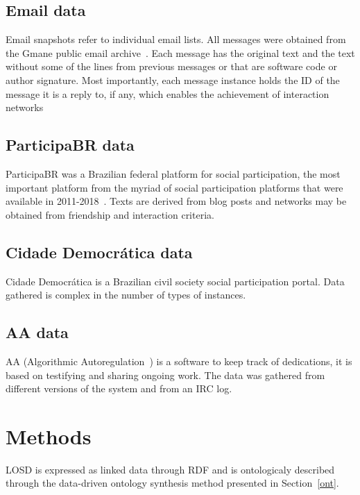 \documentclass[journal,article,submit,moreauthors,pdftex]{Definitions/mdpi}
\begin{document}
\subsection{Email data}
Email snapshots refer to individual email lists.
All messages were obtained from the Gmane public email archive~\cite{gmane}.
Each message has the original text and the text without some of the lines
from previous messages or that are software code or author signature.
Most importantly, each message instance holds the ID of the message it is
a reply to, if any, which enables the achievement of interaction networks~\cite{bird,stab}

\subsection{ParticipaBR data}
ParticipaBR was a Brazilian federal platform for social participation,
the most important platform from the myriad of social participation platforms
that were available in 2011-2018~\cite{spbr}.
Texts are derived from blog posts and networks may be obtained from
friendship and interaction criteria.

\subsection{Cidade Democr\'atica data}
Cidade Democrática is a Brazilian civil society social participation portal.
Data gathered is complex in the number of types of instances.

\subsection{AA data}
AA (Algorithmic Autoregulation~\cite{aa,aa2}) is a software to keep track of dedications,
it is based on testifying and sharing ongoing work.
The data was gathered from different versions of the system and from an IRC
log.
 
 
\section{Methods}
LOSD is expressed as linked data through RDF
and is ontologicaly described through the
data-driven ontology synthesis method presented in Section~\ref{ont}.
\end{document}
